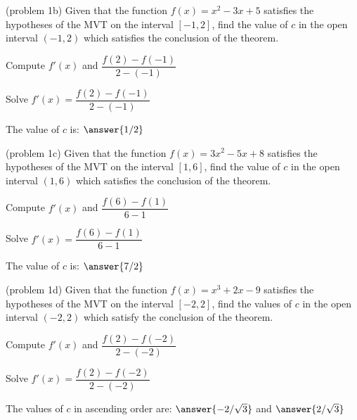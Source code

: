 \documentclass[handout]{ximera}
\begin{document}
\begin{problem}(problem 1b)
  Given that the function $f(x) = x^2 -3x + 5$ satisfies the hypotheses of the MVT on the
	interval $[-1,2]$, find the value of $c$ in the open interval $(-1,2)$ which satisfies 
	the conclusion of the theorem.
	
    \begin{hint}
      Compute $f'(x)$ and $\dfrac{f(2) - f(-1)}{2-(-1)}$
    \end{hint}
		\begin{hint}
		  Solve $f'(x) = \dfrac{f(2) - f(-1)}{2-(-1)}$
		\end{hint}
		
		The value of $c$ is:
		 $\answer{1/2}$
\end{problem}

\begin{problem}(problem 1c)
  Given that the function $f(x) = 3x^2 -5x + 8$ satisfies the hypotheses of the MVT on the
	interval $[1,6]$, find the value of $c$ in the open interval $(1,6)$ which satisfies 
	the conclusion of the theorem.
	
    \begin{hint}
      Compute $f'(x)$ and $\dfrac{f(6) - f(1)}{6-1}$
    \end{hint}
		\begin{hint}
		  Solve $f'(x) = \dfrac{f(6) - f(1)}{6-1}$
		\end{hint}
		
		The value of $c$ is:
		 $\answer{7/2}$
\end{problem}

\begin{problem}(problem 1d)
  Given that the function $f(x) = x^3 + 2x -9$ satisfies the hypotheses of the MVT on the
	interval $[-2,2]$, find the values of $c$ in the open interval $(-2,2)$ which satisfy 
	the conclusion of the theorem.
	
    \begin{hint}
      Compute $f'(x)$ and $\dfrac{f(2) - f(-2)}{2-(-2)}$
    \end{hint}
		\begin{hint}
		  Solve $f'(x) = \dfrac{f(2) - f(-2)}{2-(-2)}$
		\end{hint}
		
		The values of $c$ in ascending order are:
		 $\answer{-2/\sqrt 3}$ and $\answer{2/\sqrt 3}$
\end{problem}
\end{document}
